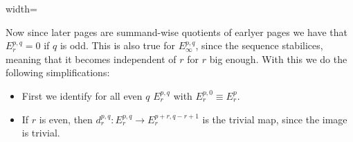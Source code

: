 \begin{corollary} 
\begin{framed}
\begin{center}
\begin{adjustbox}{width=\textwidth}
				\end{adjustbox}
			\end{center}
		\end{framed}
		Now since later pages are summand-wise quotients of earlyer pages we have that $E^{p,q}_r=0$ if $q$ is odd. This is also true for $E^{p,q}_{\infty}$, since the sequence stabilices, meaning that it becomes independent of $r$ for $r$ big enough. With this we do the following simplifications: 
		\begin{itemize}
			\item First we identify for all even $q$ $E^{p,q}_r$ with $E^{p,0}_r \equiv E^p_r$.
			\item If $r$ is even, then $d^{p,q}_r: E^{p,q}_r\to E^{p+r,q-r+1}_r$ is the trivial map, since the image is trivial. 
		\end{itemize} 
	\end{corollary}
	
	
	
